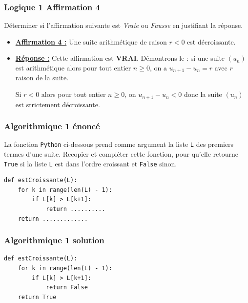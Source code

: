 \documentclass[11pt, hyperref={urlcolor=red,%
            linkcolor=blue, %
            colorlinks=true}]{beamer}
\newcommand{\suite}[1]{\ensuremath{\left(#1_{n}\right)}}
\begin{document}
\begin{frame}
\frametitle{Logique 1 Affirmation 4}

Déterminer si l'affirmation suivante est  \textit{Vraie} ou \textit{Fausse} en justifiant la réponse. 



\begin{itemize}
    \item \underline{\textbf{Affirmation 4 :}}
Une suite arithmétique de raison $r<0$ est décroissante.


\pause \item  \underline{\textbf{Réponse :}} Cette affirmation est \textbf{VRAI}. Démontrons-le : si une suite $\suite{u}$ est arithmétique alors  pour tout  entier $n \geqslant 0$, on a $u_{n+1}-u_{n}=r$ avec $r$ raison de la suite.

Si $r<0$ alors pour tout entier $n \geqslant 0$, on $u_{n+1}-u_{n}<0$ donc la suite $\suite{u}$ est strictement décroissante. 
\end{itemize}
	

\end{frame}




\begin{frame}[fragile]
\frametitle{Algorithmique 1  énoncé}
\label{algo1}

La fonction \texttt{Python} ci-dessous prend comme argument la liste  \texttt{L}  des premiers termes d'une suite. Recopier et compléter cette fonction, pour qu'elle retourne \lstinline+True+ si la liste \lstinline+L+ est dans l'ordre croissant et \lstinline+False+ sinon.

\begin{lstlisting}[style=rond]
def estCroissante(L):
	for k in range(len(L) - 1):
		if L[k] > L[k+1]:
			return ..........
	return .............
\end{lstlisting}

\end{frame}




\begin{frame}[fragile]
\frametitle{Algorithmique 1  solution}



\begin{lstlisting}[style=rond]
def estCroissante(L):
	for k in range(len(L) - 1):
		if L[k] > L[k+1]:
			return False
	return True
\end{lstlisting}

\end{frame}
\end{document}
